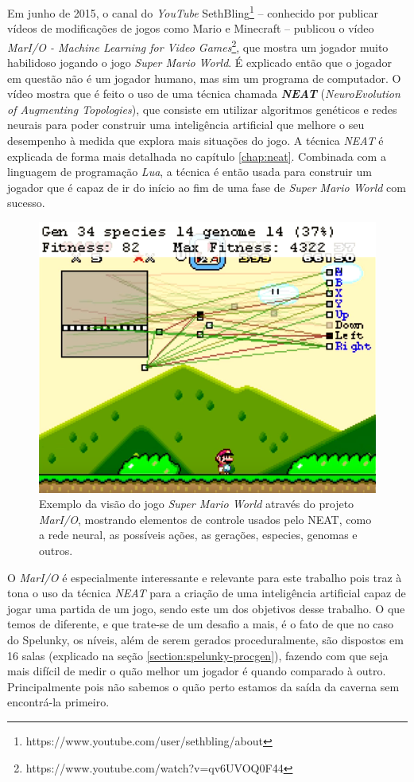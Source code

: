 Em junho de 2015, o canal do \textit{YouTube}
SethBling\footnote{https://www.youtube.com/user/sethbling/about} -- conhecido
por publicar vídeos de modificações de jogos como Mario e Minecraft -- publicou
o vídeo \textit{MarI/O - Machine Learning for Video
Games}\footnote{https://www.youtube.com/watch?v=qv6UVOQ0F44}, que mostra um
jogador muito habilidoso jogando o jogo \textit{Super Mario World}. É explicado
então que o jogador em questão não é um jogador humano, mas sim um programa de
computador.
O vídeo mostra que é feito o uso de uma técnica chamada
\textit{\textbf{NEAT}} (\textit{NeuroEvolution of Augmenting
Topologies})\cite{stanley:ec02}, que consiste em utilizar algoritmos
genéticos e redes neurais para poder construir uma inteligência artificial
que melhore o seu desempenho à medida que explora mais situações do jogo. A
técnica \textit{NEAT} é explicada de forma mais detalhada no capítulo
\ref{chap:neat}. Combinada com a linguagem de programação \textit{Lua}, a
técnica é então usada para construir um jogador que é capaz de ir do início ao
fim de uma fase de \textit{Super Mario World} com sucesso.

\begin{figure}[htb!]
\centering
\includegraphics[width=.65\textwidth]{fig/mar-io-example.png}
\caption{\label{fig:mar-io-example}Exemplo da visão do jogo \textit{Super
Mario World} através do projeto \textit{MarI/O}, mostrando elementos de
controle usados pelo NEAT, como a rede neural, as possíveis ações, as
gerações, especies, genomas e outros.}
\end{figure}

O \textit{MarI/O} é especialmente interessante e relevante para este trabalho
pois traz à tona o uso da técnica \textit{NEAT} para a criação de uma
inteligência artificial capaz de jogar uma partida de um jogo, sendo este
um dos objetivos desse trabalho. O que temos de diferente, e que trate-se de um
desafio a mais, é o fato de que no caso do Spelunky, os níveis, além de serem
gerados proceduralmente, são dispostos em 16 salas (explicado na seção
\ref{section:spelunky-procgen}), fazendo com que seja mais difícil de
medir o quão melhor um jogador é quando comparado à outro. Principalmente
pois não sabemos o quão perto estamos da saída da caverna sem encontrá-la
primeiro.
